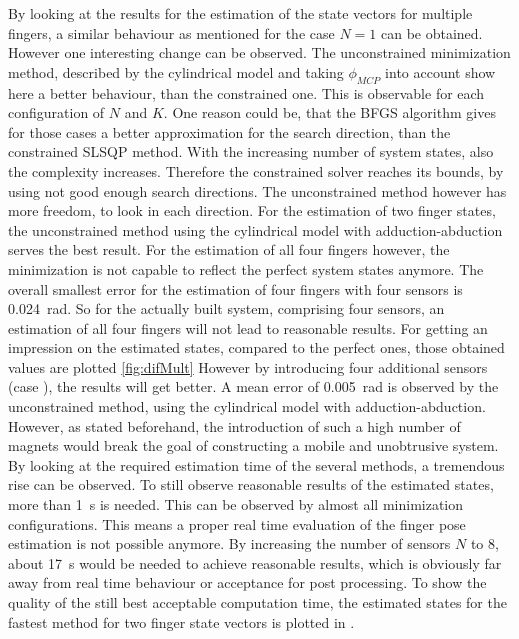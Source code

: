 By looking at the results for the estimation of the state vectors for multiple fingers, a similar behaviour as mentioned for the case $ N = 1 $ can be obtained. However one interesting change can be observed. The unconstrained minimization method, described by the cylindrical model and taking $ \phi_{MCP} $ into account show here a better behaviour, than the constrained one. This is observable for each configuration of $ N $ and $ K $. One reason could be, that the \ac{BFGS} algorithm gives for those cases a better approximation for the search direction, than the constrained \ac{SLSQP} method. With the increasing number of system states, also the complexity increases. Therefore the constrained solver reaches its bounds, by using not good enough search directions. The unconstrained method however has more freedom, to look in each direction. For the estimation of two finger states, the unconstrained method using the cylindrical model with adduction-abduction serves the best result. For the estimation of all four fingers however, the minimization is not capable to reflect the perfect system states anymore. The overall smallest error for the estimation of four fingers with four sensors is \SI{0.024}{\radian}. So for the actually built system, comprising four sensors, an estimation of all four fingers will not lead to reasonable results. For getting an impression on the estimated states, compared to the perfect ones, those obtained values are plotted \ref{fig:difMult} However by introducing four additional sensors (case  \grqq), the results will get better. A mean error of \SI{0.005}{\radian} is observed by the unconstrained method, using the cylindrical model with adduction-abduction. However, as stated beforehand, the introduction of such a high number of magnets would break the goal of constructing a mobile and unobtrusive system. \\
By looking at the required estimation time of the several methods, a tremendous rise can be observed. To still observe reasonable results of the estimated states, more than \SI{1}{\second} is needed. This can be observed by almost all minimization configurations. This means a proper real time evaluation of the finger pose estimation is not possible anymore. By increasing the number of sensors $ N $ to 8, about \SI{17}{\second} would be needed to achieve reasonable results, which is obviously far away from real time behaviour or acceptance for post processing. To show the quality of the still best acceptable computation time, the estimated states for the fastest method for two finger state vectors is plotted in  . 

